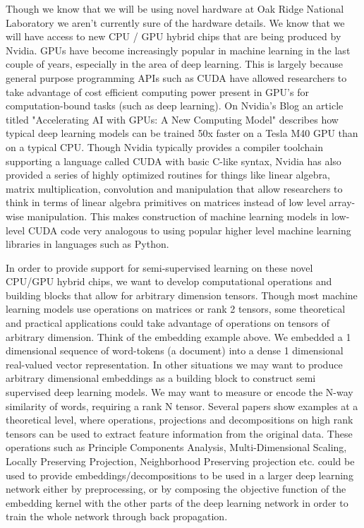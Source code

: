 Though we know that we will be using novel hardware at Oak Ridge National Laboratory we aren't currently sure of the hardware details. We know that we will have access to new CPU / GPU hybrid chips that are being produced by Nvidia. GPUs have become increasingly popular in machine learning in the last couple of years, especially in the area of deep learning. This is largely because general purpose programming APIs such as CUDA have allowed researchers to take advantage of cost efficient computing power present in GPU's for computation-bound tasks (such as deep learning). On Nvidia's Blog an article titled "Accelerating AI with GPUs: A New Computing Model" describes how typical deep learning models can be trained 50x faster on a Tesla M40 GPU than on a typical CPU. Though Nvidia typically provides a compiler toolchain supporting a language called CUDA with basic C-like syntax, Nvidia has also provided a series of highly optimized routines for things like linear algebra, matrix multiplication, convolution and manipulation that allow researchers to think in terms of linear algebra primitives on matrices instead of low level array-wise manipulation\cite{chetlur2014cudnn}. This makes construction of machine learning models in low-level CUDA code very analogous to using popular higher level machine learning libraries in languages such as Python.

In order to provide support for semi-supervised learning on these novel CPU/GPU hybrid chips, we want to develop computational operations and building blocks that allow for arbitrary dimension tensors. Though most machine learning models use operations on matrices or rank 2 tensors, some theoretical and practical applications could take advantage of operations on tensors of arbitrary dimension. Think of the embedding example above. We embedded a 1 dimensional sequence of word-tokens (a document) into a dense 1 dimensional real-valued vector representation. In other situations we may want to produce arbitrary dimensional embeddings as a building block to construct semi supervised deep learning models. We may want to measure or encode the N-way similarity of words, requiring a rank N tensor. Several papers show examples at a theoretical level, where operations, projections and decompositions on high rank tensors can be used to extract feature information from the original data\cite{cichocki2016low, cichocki2014tensor}. These operations such as Principle Components Analysis, Multi-Dimensional Scaling, Locally Preserving Projection, Neighborhood Preserving projection etc. could be used to provide embeddings/decompositions to be used in a larger deep learning network either by preprocessing, or by composing the objective function of the embedding kernel with the other parts of the deep learning network in order to train the whole network through back propagation.

